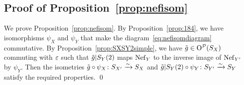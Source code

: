 \documentclass{amsart}
\numberwithin{procedure}{section}
\begin{document}
\subsection{Proof of Proposition~\ref{prop:nefisom}}\label{subsec:proofprop:nefisom}
We prove Proposition~\ref{prop:nefisom}.
By Proposition~\ref{prop:184}, we have isomorphisms $\psi_X$ and $\psi_Y$ 
that make the diagram~\eqref{eq:nefisomdiagram} commutative.
By Proposition~\ref{prop:SXSY2simple},
we have $\tilde{g}\in \mathord{\mathrm{O}}^{\mathord{\mathcal P}}(S_{X})$  commuting with $\varepsilon$ 
such that $\tilde{g}|S_{Y}(2)$ maps $\mathord{\rm Nef}_{Y}$ to  the inverse image of $\mathord{\rm Nef}_{Y\sp\prime}$ by $\psi_Y$.
Then the isometries $\tilde{g}\circ \psi_X\colon S_{X\sp\prime}\xrightarrow{\sim} S_{X}$ and 
$\tilde{g}|S_{Y}(2)\circ \psi_Y \colon S_{Y\sp\prime}\xrightarrow{\sim} S_{Y}$ satisfy the required properties.
\qed
%
%
\end{document}
